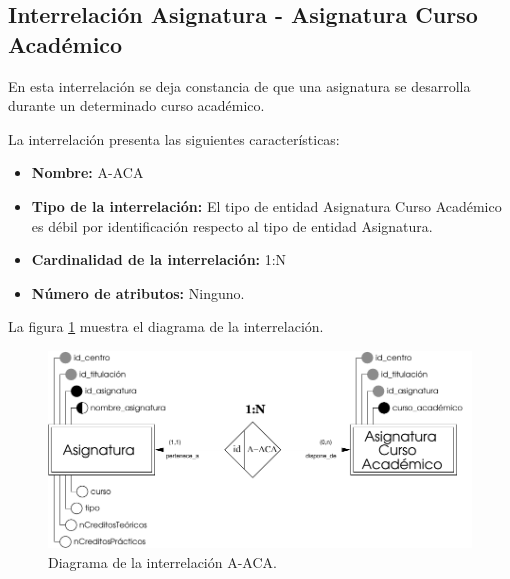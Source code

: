 \subsection{Interrelación Asignatura - Asignatura Curso Académico}

   \begin{description}
      \item[Definición] En esta interrelación se deja constancia de que una
      asignatura se desarrolla durante un determinado curso académico.

      \item[Características] La interrelación presenta las siguientes
                             características:

         \begin{itemize}
            \item \textbf{Nombre:} A-ACA
            \item \textbf{Tipo de la interrelación:} El tipo de entidad
                  Asignatura Curso Académico es débil por identificación
                  respecto al tipo de entidad Asignatura.
            \item \textbf{Cardinalidad de la interrelación:} 1:N
            \item \textbf{Número de atributos:} Ninguno.
         \end{itemize}

      \item[Diagrama] La figura \ref{diagramaA-ACA} muestra el diagrama de la
                      interrelación.

      \item \begin{figure}[!ht]
            \begin{center}
            \includegraphics[]{07.Modelo_Entidad-Interrelacion/7.3.Analisis_Interrelaciones/diagramas/A-ACA.pdf}
            \caption{Diagrama de la interrelación A-ACA.}
            \label{diagramaA-ACA}
            \end{center}
         \end{figure}


\end{description}
